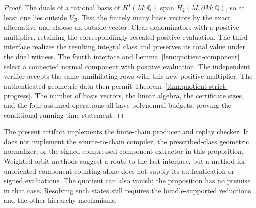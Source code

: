 \begin{proof}
The duals of a rational basis of $H^1(M;\mathbb Q)$ span
$H_2(M,\partial M;\mathbb Q)$, so at least one lies outside
$V_{\mathcal B}$. Test the finitely many basis vectors by the
exact alternative and choose an outside vector. Clear
denominators with a positive multiplier, retaining the
correspondingly rescaled positive evaluation.
The third interface realizes the resulting integral class
and preserves its total value under the dual witness.
The fourth interface and Lemma~\ref{lem:quotient-component}
select a connected normal component with positive evaluation.
The independent verifier accepts the same annihilating rows
with this new positive multiplier. The authenticated geometric
data then permit Theorem~\ref{thm:quotient-strict-progress}.
The number of basis vectors, the linear algebra, the certificate
sizes, and the four assumed operations all have polynomial
budgets, proving the conditional running-time statement.
\end{proof}

The present artifact implements the finite-chain producer and
replay checker. It does not implement the source-to-chain
compiler, the prescribed-class geometric normalizer, or the
signed compressed component extractor in this proposition.
Weighted orbit methods suggest a route to the last interface,
but a method for unoriented component counting alone does not
supply its authentication or signed evaluations.
The quotient can also vanish; the proposition has no premise
in that case. Resolving such states still requires the
bundle-supported reductions and the other hierarchy mechanisms.


